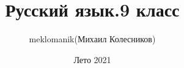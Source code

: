\documentclass[a4paper, 12pt]{article}
\title{Русский язык.9 класс}
\author{meklomanik(Михаил Колесников)}
\date{Лето 2021}
\begin{document}
 

	    \maketitle{} \clearpage
	    \tableofcontents \clearpage
\end{document}
